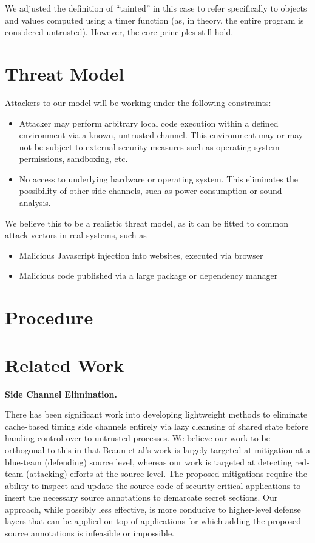 \documentclass[12pt]{article}
\begin{document}
\begin{multicols*}{2}
  We adjusted the definition of ``tainted'' in this case to refer specifically
  to objects and values computed using a timer function (as, in theory, the
  entire program is considered untrusted). However, the core principles still
  hold.

  \section{Threat Model}

  Attackers to our model will be working under the following constraints:

  \begin{itemize}
    \item Attacker may perform arbitrary local code execution within a defined
      environment via a known, untrusted channel. This environment may or may
      not be subject to external security measures such as operating system
      permissions, sandboxing, etc.
    \item No access to underlying hardware or operating system. This eliminates
      the possibility of other side channels, such as power consumption or
      sound analysis.
  \end{itemize}

  We believe this to be a realistic threat model, as it can be fitted to
  common attack vectors in real systems, such as

  \begin{itemize}
    \item Malicious Javascript injection into websites, executed via browser
    \item Malicious code published via a large package or dependency manager
  \end{itemize}

  \section{Procedure}

  \section{Related Work}

  \textbf{Side Channel Elimination.}

  There has been significant work into
  developing lightweight methods to eliminate cache-based timing side channels
  entirely via lazy cleansing of shared state before handing control over to
  untrusted processes\cite{lcache}. We believe our work to be orthogonal to
  this in that Braun et al's work is largely targeted at mitigation at a
  blue-team (defending) source level, whereas our work is targeted at detecting
  red-team (attacking) efforts at the source level. The proposed  mitigations
  require the ability to inspect and update the source code of
  security-critical applications to insert the necessary source annotations to
  demarcate secret sections. Our approach, while possibly less effective, is
  more conducive to higher-level defense layers that can be applied on top of
  applications for which adding the proposed source annotations is infeasible
  or impossible.


\end{multicols*}
\end{document}
